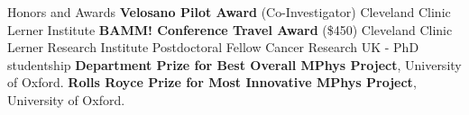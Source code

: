 \begin{rubric}{Honors and Awards}
\entry*[2022-2023] \textbf{Velosano Pilot Award} (Co-Investigator) Cleveland Clinic Lerner Institute
%
\entry*[2022] \textbf{BAMM! Conference Travel Award} (\$450)
%
\entry*[2021-present] Cleveland Clinic Lerner Research Institute Postdoctoral Fellow 
%
\entry*[2015-2020] Cancer Research UK - PhD studentship 
%
\entry*[2015] \textbf{Department Prize for Best Overall MPhys Project}, University of Oxford.
%
\entry*[2015] \textbf{Rolls Royce Prize for Most Innovative MPhys Project}, University of Oxford.
\end{rubric}